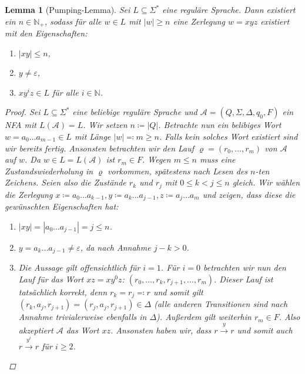 \documentclass[11pt, a4paper]{article}
\theoremstyle{definition}
\theoremstyle{plain}
\newtheorem{lemma}[definition]{Lemma}
\numberwithin{equation}{section}
\newcommand{\reaches}{\xrightarrow}
\begin{document}
\begin{lemma}[Pumping-Lemma]\label{lem:pumping-lemma}
	Sei $L \subseteq \Sigma^\ast$ eine reguläre Sprache. Dann existiert ein $n \in \mathbb{N}_+$, sodass für alle $w \in L$ mit $|w| \geq n$ eine Zerlegung $w = xyz$ existiert mit den Eigenschaften:
	\begin{enumerate}
		\item $|xy| \leq n$,
		\item $y \neq \varepsilon$,
		\item $xy^iz \in L$ für alle $i \in \mathbb{N}$. 
	\end{enumerate}
	\begin{proof}
		Sei $L \subseteq \Sigma^\ast$ eine beliebige reguläre Sprache und $\mathcal{A} = (Q, \Sigma, \Delta, q_0, F)$ ein NFA mit $L(\mathcal{A}) = L$. Wir setzen $n \coloneqq |Q|$. Betrachte nun ein belibiges Wort $w = a_0 \ldots a_{m-1} \in L$ mit Länge $|w| \eqqcolon m \geq n$. Falls kein solches Wort existiert sind wir bereits fertig. Ansonsten betrachten wir den Lauf $\varrho = (r_0, \ldots, r_m)$ von $\mathcal{A}$ auf $w$. Da $w \in L = L(\mathcal{A})$ ist $r_m \in F$. Wegen $m \leq n$ muss eine Zustandswiederholung in $\varrho$ vorkommen, spätestens nach Lesen des $n$-ten Zeichens. Seien also die Zustände $r_k$ und $r_j$ mit $0 \leq k < j \leq n$ gleich. Wir wählen die Zerlegung $x \coloneqq a_0 \ldots a_{k-1}, y \coloneqq a_k \ldots a_{j-1}, z \coloneqq a_j \ldots a_m$ und zeigen, dass diese die gewünschten Eigenschaften hat:
		\begin{enumerate}
			\item $|xy| = |a_0 \ldots a_{j-1}| = j \leq n$. \checkmark
			\item $y = a_k \ldots a_{j-1} \neq \varepsilon$, da nach Annahme $j-k > 0$. \checkmark
			\item Die Aussage gilt offensichtlich für $i = 1$. Für $i = 0$ betrachten wir nun den Lauf für das Wort $xz = xy^0z$: $(r_0, \ldots, r_k, r_{j+1}, \ldots, r_m)$. Dieser Lauf ist tatsächlich korrekt, denn $r_k = r_j \eqqcolon r$ und somit gilt $(r_k, a_j, r_{j+1}) = (r_j, a_j, r_{j+1}) \in \Delta$ (alle anderen Transitionen sind nach Annahme trivialerweise ebenfalls in $\Delta$). Außerdem gilt weiterhin $r_m \in F$. Also akzeptiert $\mathcal{A}$ das Wort $xz$. Ansonsten haben wir, dass $r \reaches{y} r$ und somit auch $r \reaches{y^i} r$ für $i \geq 2$.\checkmark \qedhere
		\end{enumerate}
	\end{proof}
\end{lemma}
\end{document}
